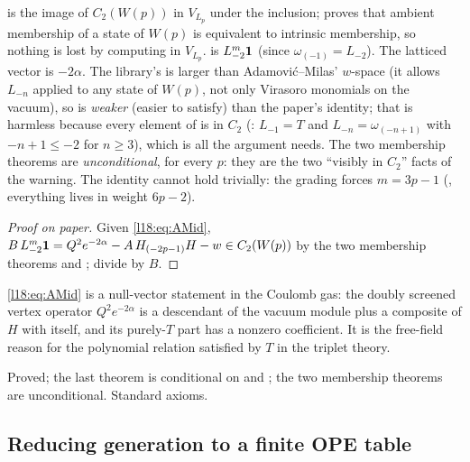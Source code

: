 \begin{dictionary}
 is the image of $C_2(W(p))$ in $V_{L_p}$ under the inclusion; 
proves that ambient membership of a state of $W(p)$ is equivalent to intrinsic membership, so nothing
is lost by computing in $V_{L_p}$.  is $L_{-2}^m\mathbf{1}$ (since
$\omega_{(-1)}=L_{-2}$). The latticed vector  is $-2\alpha$. The library's
 is larger than Adamovi\'c--Milas' $w$-space (it allows $L_{-n}$ applied to any state of
$W(p)$, not only Virasoro monomials on the vacuum), so  is \emph{weaker} (easier to
satisfy) than the paper's identity; that is harmless because every element of  is in
$C_2$ (: $L_{-1}=T$ and $L_{-n}=\omega_{(-n+1)}$ with $-n+1\le-2$ for $n\ge3$),
which is all the argument needs. The two membership theorems are \emph{unconditional}, for every $p$:
they are the two ``visibly in $C_2$'' facts of the warning. The identity cannot hold trivially: the
grading forces $m=3p-1$ (, everything lives in weight $6p-2$).
\end{dictionary}
\begin{proof}[Proof on paper]
Given \eqref{l18:eq:AMid}, $B\,L_{-2}^m\mathbf{1}=Q^2e^{-2\alpha}-A\,H_{(-2p-1)}H-w\in C_2(W(p))$ by
the two membership theorems and ; divide by $B$.
\end{proof}
\begin{physics}
\eqref{l18:eq:AMid} is a null-vector statement in the Coulomb gas: the doubly screened vertex operator
$Q^2e^{-2\alpha}$ is a descendant of the vacuum module plus a composite of $H$ with itself, and its
purely-$T$ part has a nonzero coefficient. It is the free-field reason for the polynomial relation
satisfied by $T$ in the triplet theory.
\end{physics}
\begin{status}
Proved; the last theorem is conditional on  and ; the two
membership theorems are unconditional. Standard axioms.
\end{status}

\subsection{Reducing generation to a finite OPE table}

